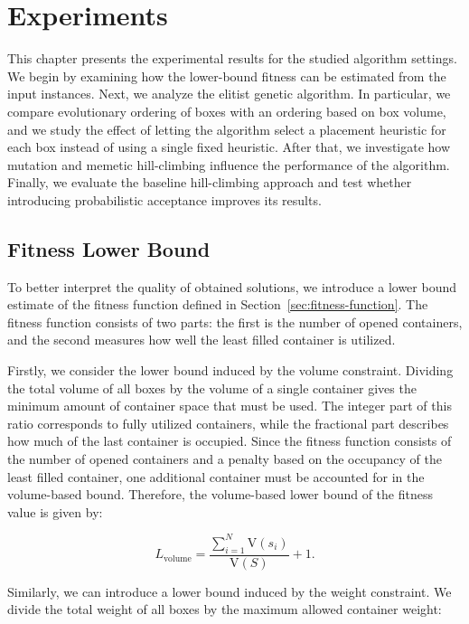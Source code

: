 \chapter{Experiments}
\label{chap:experiments}

This chapter presents the experimental results for the studied algorithm settings. 
We begin by examining how the lower-bound fitness can be estimated from the input instances. 
Next, we analyze the elitist genetic algorithm. In particular, we compare evolutionary ordering of boxes with an ordering based on box volume, 
and we study the effect of letting the algorithm select a placement heuristic for each box instead of using a single fixed heuristic. 
After that, we investigate how mutation and memetic hill-climbing influence the performance of the algorithm. 
Finally, we evaluate the baseline hill-climbing approach and test whether introducing probabilistic acceptance improves its results.

\section{Fitness Lower Bound}

To better interpret the quality of obtained solutions, we introduce a lower bound estimate of the fitness function defined in Section~\ref{sec:fitness-function}. 
The fitness function consists of two parts: the first is the number of opened containers, and the second measures how well the least filled container is utilized. 

Firstly, we consider the lower bound induced by the volume constraint. 
Dividing the total volume of all boxes by the volume of a single container gives the minimum amount of container space that must be used. 
The integer part of this ratio corresponds to fully utilized containers, while the fractional part describes how much of the last container is occupied. 
Since the fitness function consists of the number of opened containers and a penalty based on the occupancy of the least filled container, 
one additional container must be accounted for in the volume-based bound. Therefore, the volume-based lower bound of the fitness value is given by:

\[
L_{\mathrm{volume}} = \frac{\sum_{i=1}^{N} \mathrm{V}(s_i)}{\mathrm{V}(S)} + 1.
\]

Similarly, we can introduce a lower bound induced by the weight constraint. We divide the total weight of all boxes by the maximum allowed container weight:

